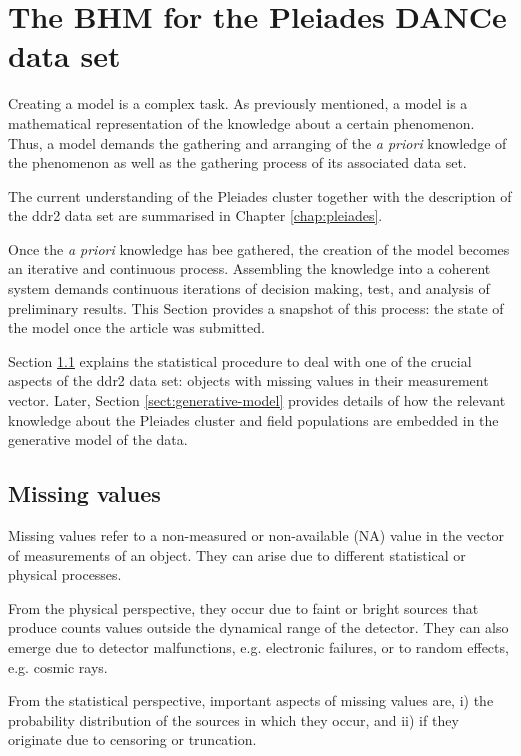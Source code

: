 \section{The BHM for the Pleiades DANCe data set}
\label{sect:datamodelling}
Creating a model is a complex task. As previously mentioned, a model is a mathematical representation of the knowledge about a certain phenomenon. Thus, a model demands the gathering and arranging of the \emph{a priori} knowledge of the phenomenon as well as the gathering process of its associated data set. 

The current understanding of the Pleiades cluster together with the description of the \gls{ddr2} data set are summarised in Chapter \ref{chap:pleiades}. 

Once the \emph{a priori} knowledge has bee gathered, the creation of the model becomes an iterative and continuous process. Assembling the knowledge into a coherent system demands continuous iterations of decision making, test, and analysis of preliminary results. This Section provides a snapshot of this process: the state of the model once the article \citet{Olivares2017} was submitted.

Section \ref{sect:missing} explains the statistical procedure to deal with one of the crucial aspects of the \gls{ddr2} data set: objects with missing values in their measurement vector. Later, Section \ref{sect:generative-model} provides details of how the relevant knowledge about the Pleiades cluster and field populations are embedded in the generative model of the data.
\subsection{Missing values}
\label{sect:missing}
Missing values refer to a non-measured or non-available (NA) value in the vector of measurements of an object. They can arise due to different statistical or physical processes. 

From the physical perspective, they occur due to faint or bright sources that produce counts values outside the dynamical range of the detector. They can also emerge due to detector malfunctions, e.g. electronic failures, or to random effects, e.g. cosmic rays. 

From the statistical perspective, important aspects of missing values are, i) the probability distribution of the sources in which they occur, and ii) if they originate due to censoring or truncation. 

